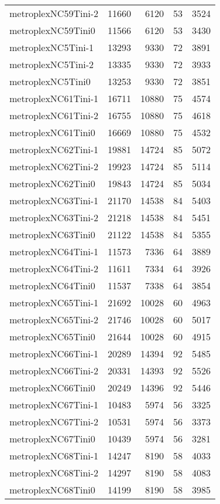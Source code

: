 \begin{tabular}{lrrrr}
metroplexNC59Tini-2 & 11660 & 6120 & 53 & 3524 \\
metroplexNC59Tini0 & 11566 & 6120 & 53 & 3430 \\
metroplexNC5Tini-1 & 13293 & 9330 & 72 & 3891 \\
metroplexNC5Tini-2 & 13335 & 9330 & 72 & 3933 \\
metroplexNC5Tini0 & 13253 & 9330 & 72 & 3851 \\
metroplexNC61Tini-1 & 16711 & 10880 & 75 & 4574 \\
metroplexNC61Tini-2 & 16755 & 10880 & 75 & 4618 \\
metroplexNC61Tini0 & 16669 & 10880 & 75 & 4532 \\
metroplexNC62Tini-1 & 19881 & 14724 & 85 & 5072 \\
metroplexNC62Tini-2 & 19923 & 14724 & 85 & 5114 \\
metroplexNC62Tini0 & 19843 & 14724 & 85 & 5034 \\
metroplexNC63Tini-1 & 21170 & 14538 & 84 & 5403 \\
metroplexNC63Tini-2 & 21218 & 14538 & 84 & 5451 \\
metroplexNC63Tini0 & 21122 & 14538 & 84 & 5355 \\
metroplexNC64Tini-1 & 11573 & 7336 & 64 & 3889 \\
metroplexNC64Tini-2 & 11611 & 7334 & 64 & 3926 \\
metroplexNC64Tini0 & 11537 & 7338 & 64 & 3854 \\
metroplexNC65Tini-1 & 21692 & 10028 & 60 & 4963 \\
metroplexNC65Tini-2 & 21746 & 10028 & 60 & 5017 \\
metroplexNC65Tini0 & 21644 & 10028 & 60 & 4915 \\
metroplexNC66Tini-1 & 20289 & 14394 & 92 & 5485 \\
metroplexNC66Tini-2 & 20331 & 14393 & 92 & 5526 \\
metroplexNC66Tini0 & 20249 & 14396 & 92 & 5446 \\
metroplexNC67Tini-1 & 10483 & 5974 & 56 & 3325 \\
metroplexNC67Tini-2 & 10531 & 5974 & 56 & 3373 \\
metroplexNC67Tini0 & 10439 & 5974 & 56 & 3281 \\
metroplexNC68Tini-1 & 14247 & 8190 & 58 & 4033 \\
metroplexNC68Tini-2 & 14297 & 8190 & 58 & 4083 \\
metroplexNC68Tini0 & 14199 & 8190 & 58 & 3985 \\

\end{tabular}

